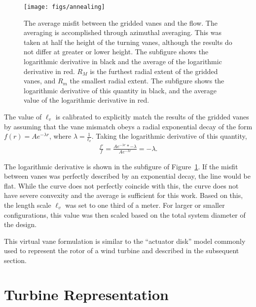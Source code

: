    \begin{figure}[!htb]
    \centering
    \texttt{[image: figs/annealing]}
     \caption{The average misfit between the gridded vanes and the
    flow. The averaging is accomplished through azimuthal
    averaging. This was taken at half the height of the turning vanes,
    although the results do not differ at greater or lower height. 
    The subfigure shows the logarithmic derivative in black and the
    average of the logarithmic derivative in red. 
    $R_{M}$ is the furthest radial extent of the gridded vanes,
    and $R_{m}$ the smallest radial extent. The subfigure shows the
    logarithmic derivative of this quantity in black, and the average
    value of the logarithmic derivative in red.}
     \label{fig:annealing}
   \end{figure}

The value of $\ell_v$ is calibrated to explicitly match the 
results of the gridded vanes by assuming that the vane mismatch 
obeys a radial exponential decay of the form $f(r) = A e^{-\lambda r}$, 
where $\lambda = \frac{1}{\ell_v}$.
Taking the logarithmic derivative of this quantity, 
\begin{eqnarray}
 \frac{f'}{f} = \frac{A e^{-\lambda r} * -\lambda}{A e^{-\lambda r}} =
  -\lambda. 
\end{eqnarray}

The logarithmic derivative is shown in the 
subfigure of Figure~\ref{fig:annealing}. If the misfit between vanes 
was perfectly described by an exponential decay, the line would be flat. 
While the curve does not perfectly coincide with this, the curve does
not have severe convexity and the average is sufficient for this
work. Based on this, the length scale $\ell_v$ was set to one third of a
meter. For larger or smaller configurations, this value was then scaled 
based on the total system diameter of the design. 


This virtual vane formulation is similar to the ``actuator disk'' model
commonly used to represent the rotor of a wind turbine and
described in the subsequent section. 

\section{Turbine Representation}
\label{sec:actuator_disk}
%
%

